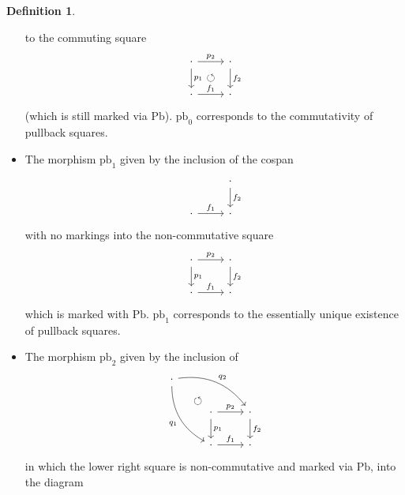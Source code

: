 \documentclass[a4paper]{article}
\theoremstyle{remark}
\theoremstyle{definition}
\newtheorem{definition}[theorem]{Definition}
\begin{document}
\begin{definition}
\begin{itemize}
      to the commuting square
      \begin{equation}
        \begin{tikzcd}
          \cdot \arrow[dr, phantom, "\circlearrowleft"] \arrow[r, "p_2"] \arrow[d, "p_1"] & \cdot \arrow[d, "f_2"] \\
          \cdot \arrow[r, "f_1"] & \cdot
        \end{tikzcd}
      \end{equation}
      (which is still marked via $\mathrm{Pb}$).
      $\mathrm{pb}_0$ corresponds to the commutativity of pullback squares.
    \item
      \label{itm:pbs-exist}
      The morphism $\mathrm{pb}_1$ given by the inclusion of the cospan
      \begin{equation}
        \begin{tikzcd}
            & \cdot \arrow[d, "f_2"] \\
            \cdot \arrow[r, "f_1"] & \cdot 
        \end{tikzcd}
      \end{equation}
      with no markings into the non-commutative square
      \begin{equation}
        \begin{tikzcd}
          \cdot \arrow[r, "p_2"] \arrow[d, "p_1"] & \cdot \arrow[d, "f_2"] \\
          \cdot \arrow[r, "f_1"] & \cdot
        \end{tikzcd}
      \end{equation}
      which is marked with $\mathrm{Pb}$.
      $\mathrm{pb}_1$ corresponds to the essentially unique existence of pullback squares.
    \item
      \label{itm:pbs-factorizations}
      The morphism $\mathrm{pb}_2$ given by the inclusion of
      \begin{equation}
        \begin{tikzcd}
          \cdot \arrow[ddr, bend right, "q_1"'] \arrow[drr, bend left, "q_2"] \arrow[dr, phantom, "\circlearrowleft", near end] \\
          & \cdot \arrow[d, "p_1"] \arrow[r, "p_2"] & \cdot \arrow[d, "f_2"] \\
          & \cdot \arrow[r, "f_1"] & \cdot
        \end{tikzcd}
      \end{equation}
      in which the lower right square is non-commutative and marked via $\mathrm{Pb}$, into the diagram
      \begin{equation}

\end{equation}
\end{itemize}
\end{definition}
\end{document}
